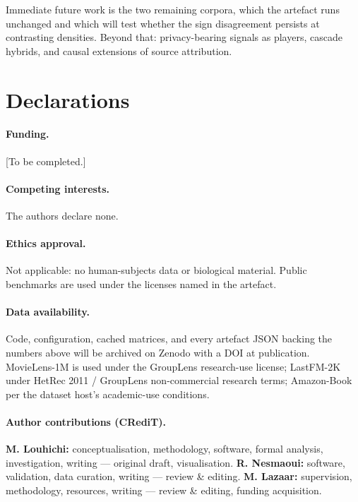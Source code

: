 \documentclass[11pt]{article}
\begin{document}
Immediate future work is the two remaining corpora, which the artefact runs
unchanged and which will test whether the sign disagreement persists at
contrasting densities. Beyond that: privacy-bearing signals as players, cascade
hybrids, and causal extensions of source attribution.

\section*{Declarations}

\paragraph{Funding.} [To be completed.]

\paragraph{Competing interests.} The authors declare none.

\paragraph{Ethics approval.} Not applicable: no human-subjects data or
biological material. Public benchmarks are used under the licenses named in the
artefact.

\paragraph{Data availability.} Code, configuration, cached matrices, and every
artefact JSON backing the numbers above will be archived on Zenodo with a DOI
at publication. MovieLens-1M is used under the GroupLens research-use license;
LastFM-2K under HetRec 2011 / GroupLens non-commercial research terms;
Amazon-Book per the dataset host's academic-use conditions.

\paragraph{Author contributions (CRediT).} \textbf{M. Louhichi:}
conceptualisation, methodology, software, formal analysis, investigation,
writing --- original draft, visualisation. \textbf{R. Nesmaoui:} software,
validation, data curation, writing --- review \& editing.
\textbf{M. Lazaar:} supervision, methodology, resources, writing ---
review \& editing, funding acquisition.
\end{document}
